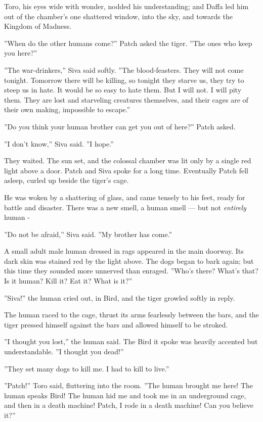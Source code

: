 \documentclass[12pt]{book}
\begin{document}
Toro, his eyes wide with wonder, nodded his understanding; and Daffa led him out of the chamber's one shattered window, into the sky, and towards the Kingdom of Madness.

''When do the other humans come?'' Patch asked the tiger. ''The ones who keep you here?''

''The war-drinkers,'' Siva said softly. ''The blood-feasters. They will not come tonight. Tomorrow there will be killing, so tonight they starve us, they try to steep us in hate. It would be so easy to hate them. But I will not. I will pity them. They are lost and starveling creatures themselves, and their cages are of their own making, impossible to escape.''

''Do you think your human brother can get you out of here?'' Patch asked.

''I don't know,'' Siva said. ''I hope.''

They waited. The sun set, and the colossal chamber was lit only by a single red light above a door. Patch and Siva spoke for a long time. Eventually Patch fell asleep, curled up beside the tiger's cage.

He was woken by a shattering of glass, and came tensely to his feet, ready for battle and disaster. There was a new smell, a human smell ---
but not {\it entirely} human -

''Do not be afraid,'' Siva said. ''My brother has come.''

A small adult male human dressed in rags appeared in the main doorway. Its dark skin was stained red by the light above. The dogs began to bark again; but this time they sounded more unnerved than enraged. ''Who's there? What's that? Is it human? Kill it? Eat it? What is it?''

''Siva!'' the human cried out, in Bird, and the tiger growled softly in reply.

The human raced to the cage, thrust its arms fearlessly between the bars, and the tiger pressed himself against the bars and allowed himself to be stroked.

''I thought you lost,'' the human said. The Bird it spoke was heavily accented but understandable. ''I thought you dead!''

''They set many dogs to kill me. I had to kill to live.''

''Patch!'' Toro said, fluttering into the room. ''The human brought me here! The human speaks Bird! The human hid me and took me in an underground cage, and then in a death machine! Patch, I rode in a death machine! Can you believe it?''
\end{document}
